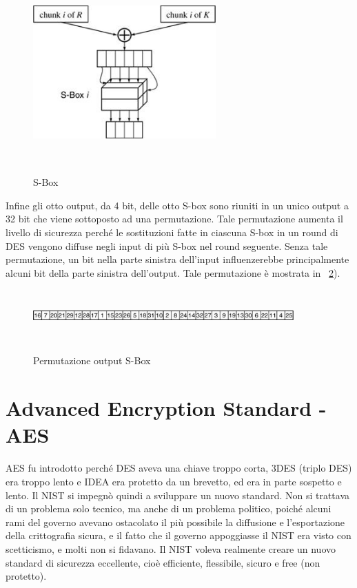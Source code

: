 \begin{figure}[htbp]
	\centering%
	\subfigure%
	{\includegraphics[height=7cm, width=7cm, keepaspectratio]{Immagini/chiave_segreta/sbox.png}}
	\caption{S-Box \label{fig:sbox}} 	
\end{figure}
Infine gli otto output, da 4 bit, delle otto S-box sono riuniti in un unico output a 32 bit che viene sottoposto ad una permutazione. Tale permutazione aumenta il livello di sicurezza perché le sostituzioni fatte in ciascuna S-box in un round di DES vengono diffuse negli input di più S-box nel round seguente. Senza tale permutazione, un bit nella parte sinistra dell'input influenzerebbe principalmente alcuni bit della parte sinistra dell'output. Tale permutazione è mostrata in \figurename ~\ref{fig:sbox_perm}).
\begin{figure}[htbp]
	\centering%
	\subfigure%
	{\includegraphics[height=2cm, width=10cm, keepaspectratio]{Immagini/chiave_segreta/sbox_perm.png}}
	\caption{Permutazione output S-Box \label{fig:sbox_perm}} 	
\end{figure}
	
\section{Advanced Encryption Standard - AES}
AES fu introdotto perché DES aveva una chiave troppo corta, 3DES (triplo DES) era troppo lento e IDEA era protetto da un brevetto, ed era in parte sospetto e lento. Il NIST si impegnò quindi a sviluppare un nuovo standard. Non si trattava di un problema solo tecnico, ma anche di un problema politico, poiché alcuni rami del governo avevano ostacolato il più possibile la diffusione e l'esportazione della crittografia sicura, e il fatto che il governo appoggiasse il NIST era visto con scetticismo, e molti non si fidavano. Il NIST voleva realmente creare un nuovo standard di sicurezza eccellente, cioè efficiente, flessibile, sicuro e free (non protetto). \newline

